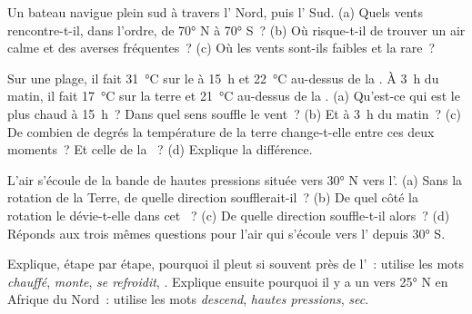 \begin{exercise}[$\star\star$]\label{exo:g8:winds-global-circulation:6}
Un bateau navigue plein sud à travers l' Nord, puis
l' Sud. (a) Quels vents rencontre-t-il, dans l'ordre, de
\ang{70} N à \ang{70} S~? (b) Où risque-t-il de trouver un air calme et
des averses fréquentes~? (c) Où les vents sont-ils faibles et la 
rare~?
\end{exercise}

\begin{exercise}[$\star\star$]\label{exo:g8:winds-global-circulation:7}
Sur une plage, il fait \qty{31}{\degreeCelsius} sur le  à 15~h et
\qty{22}{\degreeCelsius} au-dessus de la . À 3~h du matin, il fait
\qty{17}{\degreeCelsius} sur la terre et \qty{21}{\degreeCelsius}
au-dessus de la . (a) Qu'est-ce qui est le plus chaud à 15~h~? Dans
quel sens souffle le vent~? (b) Et à 3~h du matin~? (c) De combien de
degrés la température de la terre change-t-elle entre ces deux moments~?
Et celle de la ~? (d) Explique la différence.
\end{exercise}

\begin{exercise}[$\star\star$]\label{exo:g8:winds-global-circulation:8}
L'air s'écoule de la bande de hautes pressions située vers \ang{30} N vers
l'. (a) Sans la rotation de la Terre, de quelle direction
soufflerait-il~? (b) De quel côté la rotation le dévie-t-elle dans cet
~? (c) De quelle direction souffle-t-il alors~? (d) Réponds aux
trois mêmes questions pour l'air qui s'écoule vers l' depuis
\ang{30} S.
\end{exercise}

\begin{exercise}[$\star\star$]\label{exo:g8:winds-global-circulation:9}
Explique, étape par étape, pourquoi il pleut si souvent près de
l'~: utilise les mots \emph{chauffé}, \emph{monte}, \emph{se refroidit}, \emph{}.
Explique ensuite pourquoi il y a un  vers \ang{25} N en Afrique du
Nord~: utilise les mots \emph{descend}, \emph{hautes pressions}, \emph{sec}.
\end{exercise}

